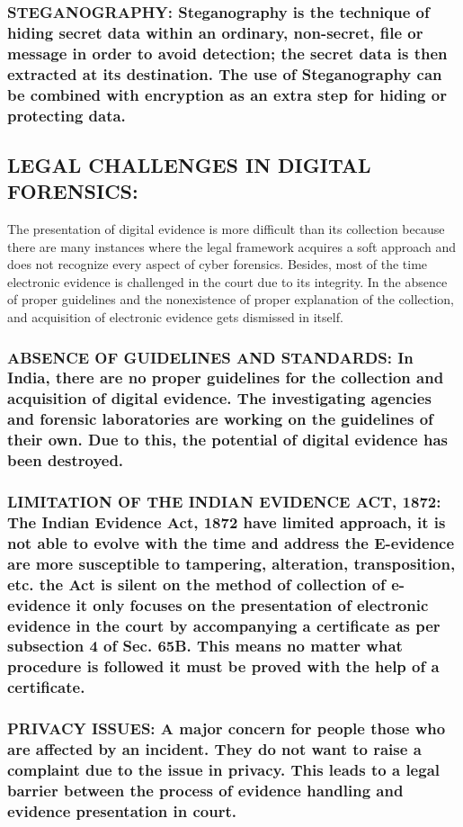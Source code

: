 \documentclass[10pt,british,english]{article}
\begin{document}
\subsubsection{STEGANOGRAPHY: Steganography is the technique of hiding secret data
within an ordinary, non-secret, file or message in order to avoid
detection; the secret data is then extracted at its destination. The
use of Steganography can be combined with encryption as an extra step
for hiding or protecting data.}

\pagebreak{}

\subsection{LEGAL CHALLENGES IN DIGITAL FORENSICS:}

The presentation of digital evidence is more difficult than its collection
because there are many instances where the legal framework acquires
a soft approach and does not recognize every aspect of cyber forensics.
Besides, most of the time electronic evidence is challenged in the
court due to its integrity. In the absence of proper guidelines and
the nonexistence of proper explanation of the collection, and acquisition
of electronic evidence gets dismissed in itself.

\subsubsection{ABSENCE OF GUIDELINES AND STANDARDS: In India, there are no proper
guidelines for the collection and acquisition of digital evidence.
The investigating agencies and forensic laboratories are working on
the guidelines of their own. Due to this, the potential of digital
evidence has been destroyed. }

\subsubsection{LIMITATION OF THE INDIAN EVIDENCE ACT, 1872: The Indian Evidence
Act, 1872 have limited approach, it is not able to evolve with the
time and address the E-evidence are more susceptible to tampering,
alteration, transposition, etc. the Act is silent on the method of
collection of e-evidence it only focuses on the presentation of electronic
evidence in the court by accompanying a certificate as per subsection
4 of Sec. 65B. This means no matter what procedure is followed it
must be proved with the help of a certificate.}

\subsubsection{PRIVACY ISSUES: A major concern for people those who are affected
by an incident. They do not want to raise a complaint due to the issue
in privacy. This leads to a legal barrier between the process of evidence
handling and evidence presentation in court.}
\end{document}
